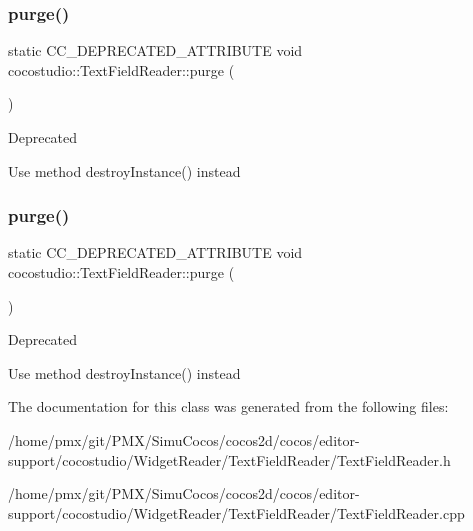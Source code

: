 \subsubsection{\texorpdfstring{purge()}{purge()}\hspace{0.1cm}{\footnotesize\ttfamily [1/2]}}
{\footnotesize\ttfamily static C\+C\+\_\+\+D\+E\+P\+R\+E\+C\+A\+T\+E\+D\+\_\+\+A\+T\+T\+R\+I\+B\+U\+TE void cocostudio\+::\+Text\+Field\+Reader\+::purge (\begin{DoxyParamCaption}{ }\end{DoxyParamCaption})\hspace{0.3cm}{\ttfamily [static]}}

\begin{DoxyRefDesc}{Deprecated}
\item[\hyperlink{deprecated__deprecated000109}{Deprecated}]Use method destroy\+Instance() instead \end{DoxyRefDesc}
\mbox{\label{classcocostudio_1_1TextFieldReader_a30b51b3a07c817a9ffb67c32750f564e}} 
\subsubsection{\texorpdfstring{purge()}{purge()}\hspace{0.1cm}{\footnotesize\ttfamily [2/2]}}
{\footnotesize\ttfamily static C\+C\+\_\+\+D\+E\+P\+R\+E\+C\+A\+T\+E\+D\+\_\+\+A\+T\+T\+R\+I\+B\+U\+TE void cocostudio\+::\+Text\+Field\+Reader\+::purge (\begin{DoxyParamCaption}{ }\end{DoxyParamCaption})\hspace{0.3cm}{\ttfamily [static]}}

\begin{DoxyRefDesc}{Deprecated}
\item[\hyperlink{deprecated__deprecated000344}{Deprecated}]Use method destroy\+Instance() instead \end{DoxyRefDesc}


The documentation for this class was generated from the following files\+:\begin{DoxyCompactItemize}
\item 
/home/pmx/git/\+P\+M\+X/\+Simu\+Cocos/cocos2d/cocos/editor-\/support/cocostudio/\+Widget\+Reader/\+Text\+Field\+Reader/Text\+Field\+Reader.\+h\item 
/home/pmx/git/\+P\+M\+X/\+Simu\+Cocos/cocos2d/cocos/editor-\/support/cocostudio/\+Widget\+Reader/\+Text\+Field\+Reader/Text\+Field\+Reader.\+cpp\end{DoxyCompactItemize}
